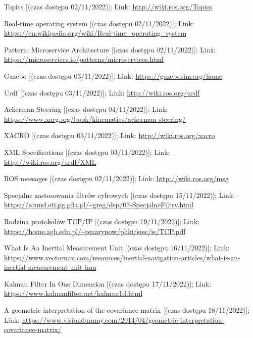 \begin{thebibliography}{9}
    Topics [(czas dostępu  02/11/2022)]; Link: 
    \url{http://wiki.ros.org/Topics}
    
    Real-time operating system [(czas dostępu  02/11/2022)]; Link: 
    \url{https://en.wikipedia.org/wiki/Real-time_operating_system}

    Pattern: Microservice Architecture [(czas dostępu  02/11/2022)]; Link: 
    \url{https://microservices.io/patterns/microservices.html}

    Gazebo [(czas dostępu  03/11/2022)]; Link: 
    \url{https://gazebosim.org/home}
    
    Urdf [(czas dostępu  03/11/2022)]; Link: 
    \url{http://wiki.ros.org/urdf}

    Ackerman Steering [(czas dostępu  04/11/2022)]; Link: 
    \url{https://www.xarg.org/book/kinematics/ackerman-steering/}
    
    XACRO [(czas dostępu  03/11/2022)]; Link: 
    \url{http://wiki.ros.org/xacro}
    
    XML Specifications [(czas dostępu  03/11/2022)]; Link: 
    \url{http://wiki.ros.org/urdf/XML}

    ROS messages [(czas dostępu  02/11/2022)]; Link: 
    \url{http://wiki.ros.org/msg}
    
    Specjalne zastosowania filtrów cyfrowych [(czas dostępu  15/11/2022)]; Link: 
    \url{https://sound.eti.pg.gda.pl/~greg/dsp/07-SpecjalneFiltry.html}

    Rodzina protokołów TCP/IP  [(czas dostępu  19/11/2022)]; Link: 
    \url{https://home.agh.edu.pl/~pmarynow/pliki/siec/is/TCP.pdf}

    What Is Aa Inertial Measurement Unit [(czas dostępu  16/11/2022)]; Link: 
    \url{https://www.vectornav.com/resources/inertial-navigation-articles/what-is-an-inertial-measurement-unit-imu}

    Kalman Filter In One Dimension [(czas dostępu  17/11/2022)]; Link: 
    \url{https://www.kalmanfilter.net/kalman1d.html}

    A geometric interpretation of the covariance matrix [(czas dostępu  18/11/2022)]; Link: 
    \url{https://www.visiondummy.com/2014/04/geometric-interpretation-covariance-matrix/}


\end{thebibliography}
